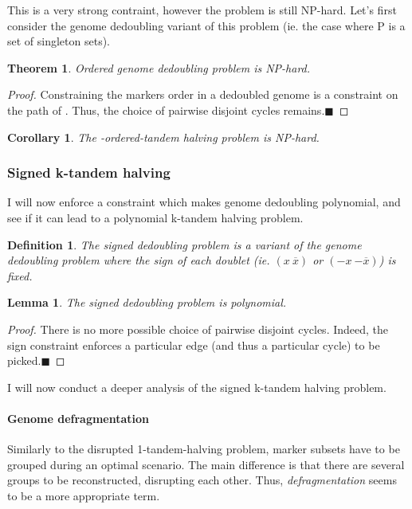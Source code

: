\documentclass[11pt,final,twoside,nofrench]{thlifl}
\newcommand{\qed}{\ensuremath{\blacksquare}}
\newcommand{\fst}[1]{ \ensuremath{#1} }
\newcommand{\snd}[1]{ \ensuremath{\overline{#1}} }
\newcommand{\msnd}[1]{ \ensuremath{{-\overline{#1}}} }
\newcommand\aff[2]{\ensuremath{(\fst{#1}~\fst{#2})}}
\newcommand\afs[2]{\ensuremath{(\fst{#1}~\snd{#2})}}
\newtheorem{proof}{Proof}
\newtheorem{theorem}{Theorem}
\newtheorem{lemma}{Lemma}
\newtheorem{definition}{Definition}
\newtheorem{corollary}{Corollary}
\begin{document}
{This is a very strong contraint, however the problem is
still NP-hard.
Let's first consider the genome dedoubling variant of this problem (ie. the case where P is a set of singleton sets).

\begin{theorem}
Ordered genome dedoubling problem is NP-hard.
\end{theorem}
\begin{proof}
Constraining the markers order in a dedoubled genome is a constraint on the path of . Thus, the choice of pairwise disjoint cycles remains.\qed
\end{proof}
\begin{corollary}
The -ordered-tandem halving problem is NP-hard.
\end{corollary}

\subsubsection{Signed k-tandem halving} 

I will now enforce a constraint which makes genome dedoubling polynomial, and see if it can lead to a polynomial k-tandem halving problem.

\begin{definition}
The \emph{signed dedoubling problem} is a variant of the genome dedoubling problem where the sign of each doublet (ie. \afs{x}{x} or \aff{-x}{\msnd{x}}) is fixed. 
\end{definition}

\begin{lemma}
The signed dedoubling problem is polynomial.
\end{lemma}
\begin{proof}
There is no more possible choice of pairwise disjoint cycles. Indeed, the sign constraint enforces a particular edge (and thus a particular cycle) to be picked.\qed
\end{proof}

I will now conduct a deeper analysis of the signed k-tandem halving problem.

\paragraph*{Genome defragmentation}

 Similarly to the disrupted 1-tandem-halving problem, marker subsets have to be grouped during an optimal scenario. The main difference is that there are several groups to be reconstructed, disrupting each other. Thus, \emph{defragmentation} seems to be a more appropriate term.

}
\end{document}
